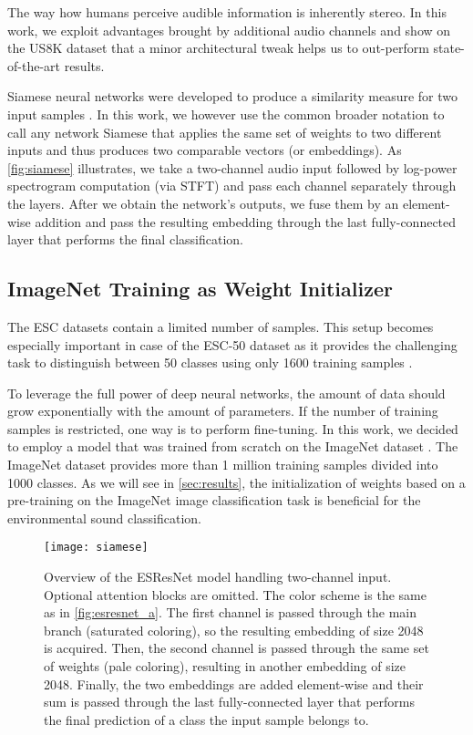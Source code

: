 \documentclass[a4paper,conference]{IEEEtran}
\begin{document}
The way how humans perceive audible information is inherently stereo.
In this work, we exploit advantages brought by additional audio channels and show on the US8K dataset that a minor architectural tweak helps us to out-perform \mbox{state-of-the-art} results.

Siamese neural networks were developed to produce a similarity measure for two input samples \cite{koch2015siamese}.
In this work, we however use the common broader notation to call any network Siamese that applies the same set of weights to two different inputs and thus produces two comparable vectors (or embeddings).
As \autoref{fig:siamese} illustrates, we take a two-channel audio input followed by log-power spectrogram computation (via STFT) and pass each channel separately through the layers.
After we obtain the network's outputs, we fuse them by an element-wise addition and pass the resulting embedding through the last fully-connected layer that performs the final classification.

\subsection{ImageNet Training as Weight Initializer} \label{ssec:imagenet}
The ESC datasets contain a limited number of samples.
This setup becomes especially important in case of the \mbox{ESC-50} dataset as it provides the challenging task to distinguish between 50 classes using only 1600 training samples \cite{piczak2015esc}.

To leverage the full power of deep neural networks, the amount of data should grow exponentially with the amount of parameters.
If the number of training samples is restricted, one way is to perform fine-tuning.
In this work, we decided to employ a model that was trained from scratch on the ImageNet dataset \cite{deng2009imagenet}.
The ImageNet dataset provides more than 1 million training samples divided into 1000 classes.
As we will see in \autoref{sec:results}, the initialization of weights based on a pre-training on the ImageNet image classification task is beneficial for the environmental sound classification.

\begin{figure}[hbt]
\centering
\texttt{[image: siamese]}
\caption{Overview of the ESResNet model handling two-channel input.
Optional attention blocks are omitted.
The color scheme is the same as in \autoref{fig:esresnet_a}.
The first channel is passed through the main branch (saturated coloring), so the resulting embedding of size 2048 is acquired.
Then, the second channel is passed through the same set of weights (pale coloring), resulting in another embedding of size 2048.
Finally, the two embeddings are added element-wise and their sum is passed through the last fully-connected layer that performs the final prediction of a class the input sample belongs to.}
\label{fig:siamese}
\end{figure}
\end{document}
